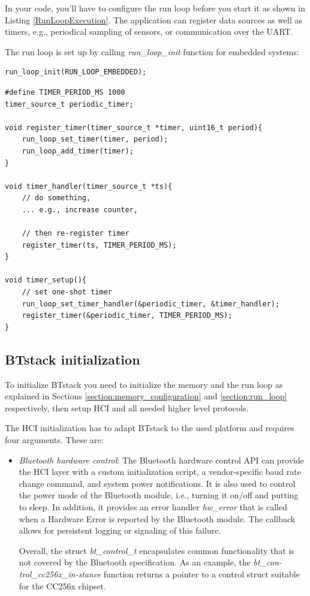 \documentclass[a4paper,titlepage,oneside,12pt]{amsart} %
\begin{document}
In your code, you'll have to configure the run loop before you start it as shown in Listing \ref{RunLoopExecution}. The application can register data sources as well as timers, e.g., periodical sampling of sensors, or communication over the UART.

The run loop is set up by calling \emph{run\_loop\_init} function for embedded systems:
\begin{lstlisting}
run_loop_init(RUN_LOOP_EMBEDDED);
\end{lstlisting}


\begin{lstlisting}[caption=Periodic counter, label=PeriodicTimeHandler]
#define TIMER_PERIOD_MS 1000
timer_source_t periodic_timer;

void register_timer(timer_source_t *timer, uint16_t period){
    run_loop_set_timer(timer, period);
    run_loop_add_timer(timer);
}

void timer_handler(timer_source_t *ts){
    // do something,
    ... e.g., increase counter,
    
    // then re-register timer
    register_timer(ts, TIMER_PERIOD_MS);
} 

void timer_setup(){
    // set one-shot timer
    run_loop_set_timer_handler(&periodic_timer, &timer_handler);
    register_timer(&periodic_timer, TIMER_PERIOD_MS);
}
\end{lstlisting}

\subsection{BTstack initialization}
\label{section:btstack_initialization}
To initialize BTstack you need to initialize the memory and the run loop as explained in Sections \ref{section:memory_configuration} and \ref{section:run_loop} respectively, then setup HCI and all needed higher level protocols.

The HCI initialization has to adapt BTstack to the used platform and requires four arguments. These are:
\begin{itemize}
\item \emph{Bluetooth hardware control}: The Bluetooth hardware control API can provide the HCI layer with a custom initialization script, a vendor-specific baud rate change command, and system power notifications. It is also used to control the power mode of the Bluetooth module, i.e., turning it on/off and putting to sleep. In addition, it provides an error handler \emph{hw\_error} that is called when a Hardware Error is reported by the Bluetooth module. The callback allows for persistent logging or signaling of this failure. 

Overall, the struct \emph{bt\_control\_t} encapsulates common functionality that is not covered by the Bluetooth specification. As an example, the \emph{bt\_con-trol\_cc256x\_in-stance} function returns a pointer to a control struct suitable for the CC256x chipset.
\end{itemize}
\end{document}

